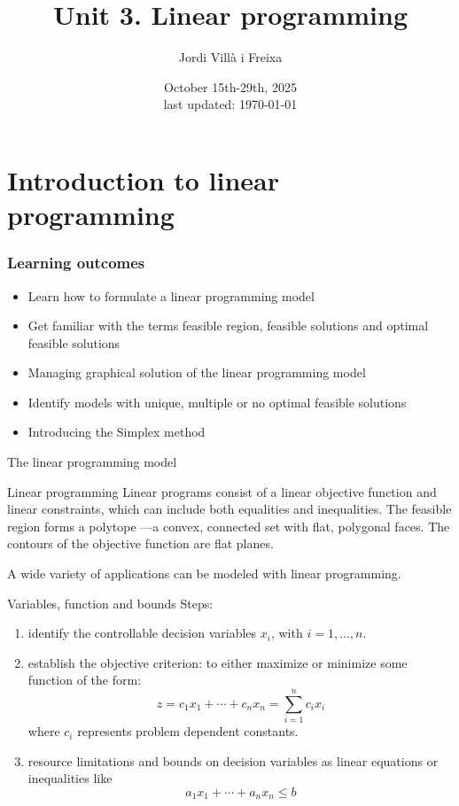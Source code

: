 \documentclass[c]{beamer}
\title[Introduction]{Unit 3. Linear programming}
\author{Jordi Villà i Freixa}
\institute[FCTE]{
Universitat de Vic - Universitat Central de Catalunya \\
Study Abroad. Operations Research\\
\medskip
\textit{jordi.villa@uvic.cat\\\url{https://mon.uvic.cat/cbbl}}
}
\date{October 15th-29th, 2025\\last updated: \today}
\begin{document}
\begin{frame}
\titlepage
\end{frame}




\section{Introduction to linear programming}

\begin{frame}
\frametitle{Learning outcomes}
\begin{itemize}
  \item Learn how to formulate a linear programming model
  \item Get familiar with the terms feasible region, feasible solutions and optimal feasible solutions
  \item Managing graphical solution of the linear programming model
  \item Identify models with unique, multiple or no optimal feasible solutions
  \item Introducing the Simplex method
\end{itemize}
\end{frame}


\begin{frame}{The linear programming model}

  \begin{block}{Linear programming}
    Linear programs consist of a linear objective function and linear constraints, which can include both equalities and inequalities. The feasible region forms a polytope —a convex, connected set with flat, polygonal faces. The contours of the objective function are flat planes.
   \cite{nocedal}
  \end{block}
  A wide variety of applications can be modeled with linear programming.

\end{frame}

\begin{frame}{Variables, function and bounds}
  Steps:
\begin{enumerate}
  \item identify the controllable decision variables $x_i$, with $i=1,\ldots,n$.
  \item establish the objective criterion: to either maximize or minimize some function of the form:
  \[
    z = c_1 x_1 +\cdots + c_n x_n = \sum_{i=1}^n c_i x_i
  \]
  where $c_i$ represents problem dependent constants.
  \item resource limitations and bounds on decision variables as linear equations or inequalities like
  \[
     a_1 x_1 +\cdots + a_n x_n \leq b
  \]
\end{enumerate}
\end{frame}
\end{document}
